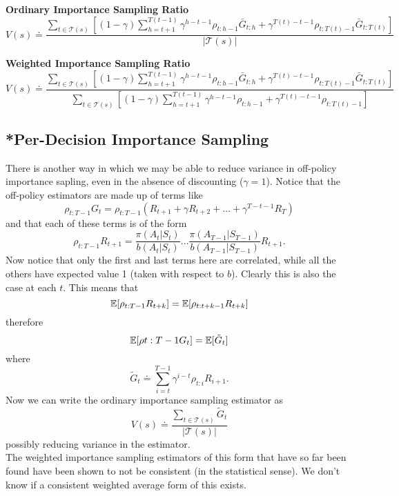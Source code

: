 {\bfseries{Ordinary Importance Sampling Ratio}}
\begin{equation}
    V(s) \doteq \frac{\sum_{t\in \mathcal{T}(s)} \left[ (1 - \gamma) \sum_{h=t+1}^{T(t-1)} \gamma^{h - t - 1}\rho_{t:h-1}\bar{G}_{t:h} + \gamma^{T(t) - t - 1}\rho_{t:T(t) - 1} \bar{G}_{t:T(t)} \right]}{|\mathcal{T}(s)|}
\end{equation}

{\bfseries{Weighted Importance Sampling Ratio}}
\begin{equation}
    V(s) \doteq \frac{\sum_{t\in \mathcal{T}(s)} \left[ (1 - \gamma) \sum_{h=t+1}^{T(t-1)} \gamma^{h - t - 1}\rho_{t:h-1}\bar{G}_{t:h} + \gamma^{T(t) - t - 1}\rho_{t:T(t) - 1} \bar{G}_{t:T(t)} \right]}{\sum_{t\in \mathcal{T}(s)} \left[ (1 - \gamma) \sum_{h=t+1}^{T(t-1)} \gamma^{h - t - 1}\rho_{t:h-1} + \gamma^{T(t) - t - 1}\rho_{t:T(t) - 1} \right]}
\end{equation}

\subsection{*Per-Decision Importance Sampling}
There is another way in which we may be able to reduce variance in off-policy importance sapling, even in the absence of discounting ($\gamma = 1$). Notice that the off-policy estimators are made up of terms like
\[
    \rho_{t:T-1}G_t = \rho_{t:T-1} (R_{t+1} + \gamma R_{t+2} + \dots+ \gamma^{T-t-1}R_{T})
\]
and that each of these terms is of the form
\[
    \rho_{t:T-1}R_{t+1} = \frac{\pi(A_t|S_t)}{b(A_t|S_t)}\dots\frac{\pi(A_{T-1}|S_{T-1})}{b(A_{T-1}|S_{T-1})}R_{t+1}.
\]
Now notice that only the first and last terms here are correlated, while all the others have expected value 1 (taken with respect to $b$). Clearly this is also the case at each $t$. This means that
\[
    \mathbb{E}{}[\rho_{t:T-1}R_{t+k}] = \mathbb{E}{}[\rho_{t:t+k-1}R_{t+k}]
\]
therefore
\[
    \mathbb{E}{}[\rho{t:T-1}G_t] = \mathbb{E}{}[\tilde{G}_t]
\]
where
\[
    \tilde{G}_t \doteq \sum_{i=t}^{T-1}\gamma^{i-t}\rho_{t:i}R_{i+1}.
\]
Now we can write the ordinary importance sampling estimator as
\[
    V(s) \doteq \frac{\sum_{t\in\mathcal{T}(s)} \tilde{G}_t}{|\mathcal{T}(s)|}
\]
possibly reducing variance in the estimator. \\

The weighted importance sampling estimators of this form that have so far been found have been shown to not be consistent (in the statistical sense). We don't know if a consistent weighted average form of this exists.
